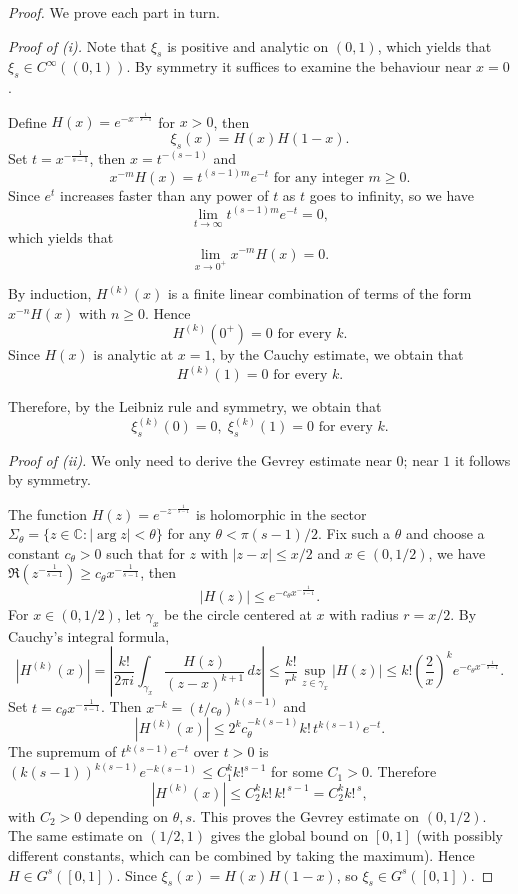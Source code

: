 \documentclass{amsart}
\begin{document}
	\begin{proof}
		We prove each part in turn.
		
		\medskip
		\noindent\textit{Proof of (i).} Note that $\xi_s$ is positive and analytic on $(0,1)$, which yields that $\xi_s\in C^\infty((0,1))$. By symmetry it suffices to examine the behaviour near \(x=0\).
		
		Define \(H(x)=e^{-x^{-\frac{1}{s-1}}}\) for \(x>0\), then \[\xi_s(x)=H(x)H(1-x).\]Set $t=x^{-\frac{1}{s-1}}$, then $x=t^{-(s-1)}$ and \[x^{-m}H(x)=t^{(s-1)m}e^{-t}\text{ for any integer } m\ge0.\]  Since $e^t$ increases faster than any power of $t$ as $t$ goes to infinity, so we have \[\lim_{t\to \infty}t^{(s-1)m}e^{-t}=0,\]which yields that \[\lim_{x\to0^+} x^{-m}H(x)=0.\]
		
		By induction, \(H^{(k)}(x)\) is a finite linear combination of terms of the form \(x^{-n}H(x)\) with \(n\ge0\). Hence \[H^{(k)}(0^+)=0\text{ for every } k.\]Since $H(x)$ is analytic at $x=1$, by the Cauchy estimate, we obtain that \[H^{(k)}(1)=0\text{ for every } k.\]
		
		Therefore, by the Leibniz rule and symmetry, we obtain that \[\xi_s^{(k)}(0)=0,\; \xi_s^{(k)}(1)=0\text{ for every } k.\]
		
		\medskip
		\noindent\textit{Proof of (ii).} We only need to derive the Gevrey estimate near \(0\); near \(1\) it follows by symmetry.
		
		The function \(H(z)=e^{-z^{-\frac{1}{s-1}}}\) is holomorphic in the sector \(\Sigma_\theta=\{z\in\mathbb C: |\arg z|<\theta\}\) for any \(\theta<\pi (s-1)/2\). Fix such a \(\theta\) and choose a constant \(c_\theta>0\) such that for \(z\) with \(|z-x|\le x/2\) and \(x\in(0,1/2)\), we have $\Re(z^{-\frac{1}{s-1}})\ge c_\theta x^{-\frac{1}{s-1}}$, then \[|H(z)|\leq e^{-c_\theta x^{-\frac{1}{s-1}}}.\]
		For \(x\in(0,1/2)\), let \(\gamma_x\) be the circle centered at \(x\) with radius \(r=x/2\). By Cauchy's integral formula,
		\[
		|H^{(k)}(x)| = \left|\frac{k!}{2\pi i}\int_{\gamma_x}\frac{H(z)}{(z-x)^{k+1}}\,dz\right|
		\le \frac{k!}{r^k}\sup_{z\in \gamma_x}|H(z)|
		\le k!\left(\frac{2}{x}\right)^k e^{-c_\theta x^{-\frac{1}{s-1}}}.
		\]
		Set \(t=c_\theta x^{-\frac{1}{s-1}}\). Then \(x^{-k}=(t/c_\theta)^{k(s-1)}\) and
		\[
		|H^{(k)}(x)| \le 2^k c_\theta^{-k(s-1)} k! \, t^{k(s-1)} e^{-t}.
		\]
		The supremum of \(t^{k(s-1)}e^{-t}\) over \(t>0\) is \((k(s-1))^{k(s-1)}e^{-k(s-1)}\le C_1^k k!^{s-1}\) for some \(C_1>0\). Therefore
		\[
		|H^{(k)}(x)| \le C_2^k k!\, k!^{\,s-1} = C_2^k k!^{\,s},
		\]
		with \(C_2>0\) depending on \(\theta,s\). This proves the Gevrey estimate on \((0,1/2)\). The same estimate on \((1/2,1)\) gives the global bound on \([0,1]\) (with possibly different constants, which can be combined by taking the maximum). Hence \(H\in G^s([0,1])\). Since $\xi_s(x)=H(x)H(1-x)$, so $\xi_s \in G^s([0,1])$.
	\end{proof}
	
\end{document}
